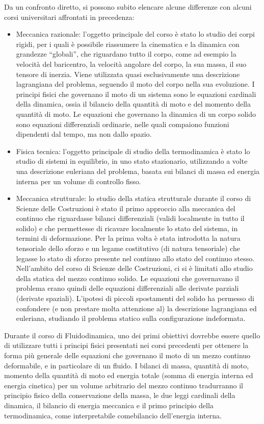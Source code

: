 \vspace{0.5cm}
Da un confronto diretto, si possono subito elencare alcune differenze con alcuni corsi universitari affrontati in precedenza:
\begin{itemize}
 \item Meccanica razionale: l'oggetto principale del corso è stato lo studio dei corpi rigidi, per i quali è possibile riassumere la cinematica e la dinamica con grandezze ``globali'', che riguardano tutto il corpo, come ad esempio la velocità del baricentro, la velocità angolare del corpo, la sua massa, il suo tensore di inerzia. Viene utilizzata quasi esclusivamente una descrizione lagrangiana del problema, seguendo il moto del corpo nella sua evoluzione. I principi fisici che governano il moto di un sistema sono le equazioni cardinali della dinamica, ossia il bilancio della quantità di moto e del momento della quantità di moto. Le equazioni che governano la dinamica di un corpo solido sono equazioni differenziali ordinarie, nelle quali compaiono funzioni dipendenti dal tempo, ma non dallo spazio.
 \item Fisica tecnica: l'oggetto principale di studio della termodinamica è stato lo studio di sistemi in equilibrio, in uno stato stazionario, utilizzando a volte una descrizione euleriana del problema, basata sui bilanci di massa ed energia interna per un volume di controllo fisso.
 \item Meccanica strutturale: lo studio della statica strutturale durante il corso di Scienze delle Costruzioni è stato il primo approccio alla meccanica del continuo che riguardasse bilanci differenziali (validi localmente in tutto il solido) e che permettesse di ricavare localmente lo stato del sistema, in termini di deformazione. Per la prima volta è stata introdotta la natura tensoriale dello sforzo e un legame costitutivo (di natura tensoriale) che legasse lo stato di sforzo presente nel continuo allo stato del continuo stesso. Nell'ambito del corso di Scienze delle Costruzioni, ci si è limitati allo studio della statica del mezzo continuo solido. Le equazioni che governavano il problema erano quindi delle equazioni differenziali alle derivate parziali (derivate spaziali). L'ipotesi di piccoli spostamenti del solido ha permesso di confondere (e non prestare molta attenzione al) la descrizione lagrangiana ed euleriana, studiando il problema statico sulla configurazione indeformata.
\end{itemize}
Durante il corso di Fluidodinamica, uno dei primi obiettivi dovrebbe essere quello di utilizzare tutti i principi fisici presentati nei corsi precedenti per ottenere la forma più generale delle equazioni che governano il moto di un mezzo continuo deformabile, e in particolare di un fluido. I bilanci di massa, quantità di moto, momento della quantità di moto ed energia totale (somma di energia interna ed energia cinetica) per un volume arbitrario del mezzo continuo tradurranno il principio fisico della conservazione della massa, le due leggi cardinali della dinamica, il bilancio di energia meccanica e il primo principio della termodinamica, come interpretabile comebilancio dell'energia interna.

